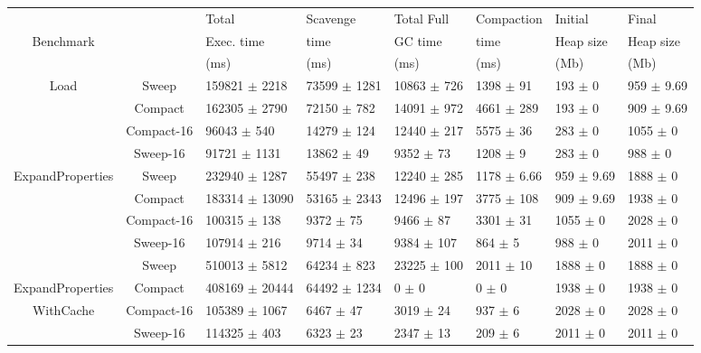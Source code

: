 \documentclass[10pt, sigplan]{acmart}
\begin{document}
\begin{figure*}[thb]
\begin{tabular}{|c|c|l|l|l|l|l|l|}
   \hline
  & & Total   & Scavenge  & Total Full  & Compaction  & Initial  & Final \\
 Benchmark & &  Exec. time &  time & GC time &  time &  Heap size & Heap size \\
  & &  (ms) &  (ms) & (ms) &  (ms) &  (Mb) &  (Mb) \\
   \hline
   \multirow{4}{*}{Load} & Sweep 	& 159821 $\pm$ 2218 &	73599 $\pm$ 1281 	& 10863 $\pm$ 726 	&1398 $\pm$ 91 	& 193 $\pm$ 0 	& 959 $\pm$ 9.69 \\
    				    & Compact 	& 162305 $\pm$ 2790 &	72150 $\pm$ 782 	& 14091 $\pm$ 972 	&4661 $\pm$ 289 	& 193 $\pm$ 0 	& 909 $\pm$ 9.69 \\
    				    & Compact-16 	& 96043 $\pm$ 540 &	14279 $\pm$ 124 	& 12440 $\pm$ 217 	&5575 $\pm$ 36 	& 283 $\pm$ 0 	& 1055 $\pm$ 0 \\
    				    & Sweep-16 		& 91721 $\pm$ 1131 &	13862 $\pm$ 49 	& 9352 $\pm$ 73 	&1208 $\pm$ 9 	& 283 $\pm$ 0 	& 988 $\pm$ 0 \\
   \hline
   \multirow{4}{*}{ExpandProperties} 	& Sweep 		& 232940 $\pm$ 1287 &	55497 $\pm$ 238 	& 12240 $\pm$ 285 	&1178 $\pm$ 6.66 	& 959 $\pm$ 9.69 & 1888 $\pm$ 0 \\
    				    			& Compact 	& 183314 $\pm$ 13090 &	53165 $\pm$ 2343 	& 12496 $\pm$ 197 	&3775 $\pm$ 108 	& 909 $\pm$ 9.69 & 1938 $\pm$ 0 \\
    				    & Compact-16 	& 100315 $\pm$ 138 &	9372 $\pm$ 75 	& 9466 $\pm$ 87 	&3301 $\pm$ 31 	& 1055 $\pm$ 0 	& 2028 $\pm$ 0 \\
    				    & Sweep-16 		& 107914 $\pm$ 216 &	9714 $\pm$ 34 	& 9384 $\pm$ 107 	&864 $\pm$ 5 	& 988 $\pm$ 0 	& 2011 $\pm$ 0 \\
   \hline
    					& Sweep 		& 510013 $\pm$ 5812 	&	64234 $\pm$ 823 	& 23225 $\pm$ 100 	&2011 $\pm$ 10 	& 1888 $\pm$ 0 	& 1888 $\pm$ 0 \\
     	ExpandProperties	& Compact 	& 408169 $\pm$ 20444 	&	64492 $\pm$ 1234 	& 0 $\pm$ 0 		&0 $\pm$ 0 		& 1938 $\pm$ 0 	& 1938 $\pm$ 0 \\
    		WithCache	& Compact-16 	& 105389 $\pm$ 1067 	&	6467 $\pm$ 47 		& 3019 $\pm$ 24 	&937 $\pm$ 6 		& 2028 $\pm$ 0 	& 2028 $\pm$ 0 \\
    				    	& Sweep-16 	& 114325 $\pm$ 403 	&	6323 $\pm$ 23 		& 2347 $\pm$ 13 	&209 $\pm$ 6 		& 2011 $\pm$ 0 	& 2011 $\pm$ 0 \\

\end{tabular}
\end{figure*}
\end{document}

